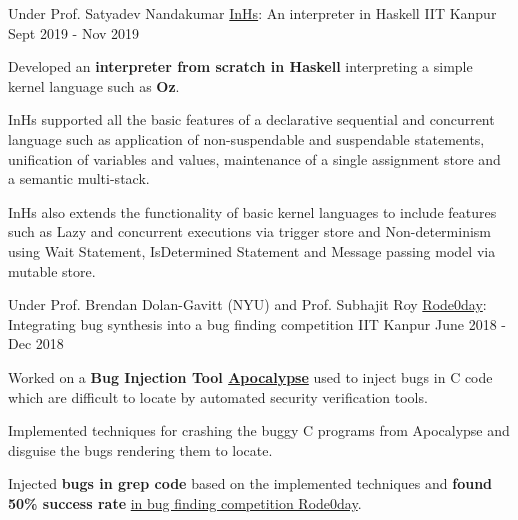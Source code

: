 

\begin{cventries}

  \cventry
    {Under Prof. Satyadev Nandakumar} %
    {\href{https://github.com/ayush268/InHs}{InHs}: An interpreter in Haskell} %
    {IIT Kanpur} %
    {Sept 2019 - Nov 2019} %
    {
      \begin{cvitems} %
      \item {Developed an \textbf{interpreter from scratch in Haskell} interpreting a simple kernel language such as \textbf{Oz}.}
      \item {InHs supported all the basic features of a declarative sequential and concurrent language such as application of non-suspendable and suspendable statements, unification of variables and values, maintenance of a single assignment store and a semantic multi-stack.}
      \item {InHs also extends the functionality of basic kernel languages to include features such as Lazy and concurrent executions via trigger store and Non-determinism using Wait Statement, IsDetermined Statement and Message passing model via mutable store.}
      \end{cvitems}
    }%


  \cventry
    {Under Prof. Brendan Dolan-Gavitt (NYU) and Prof. Subhajit Roy} %
    {\href{https://rode0day.mit.edu/}{Rode0day}: Integrating bug synthesis into a bug finding competition} %
    {IIT Kanpur} %
    {June 2018 - Dec 2018} %
    {
      \begin{cvitems} %
        \item {Worked on a \textbf{Bug Injection Tool \href{https://dl.acm.org/doi/abs/10.1145/3236024.3236084}{Apocalypse}} used to inject bugs in C code which are difficult to locate by automated security verification tools.}
        \item {Implemented techniques for crashing the buggy C programs from Apocalypse and disguise the bugs rendering them to locate.}
        \item {Injected \textbf{bugs in grep code} based on the implemented techniques and \textbf{found 50\% success rate} \href{https://rode0day.mit.edu/results/4}{in bug finding competition Rode0day}.}
      \end{cvitems}
    }


\end{cventries}
